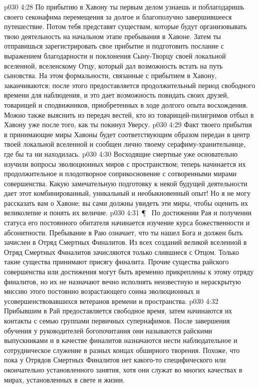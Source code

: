 \vs p030 4:28 По прибытию в Хавону ты первым делом узнаешь и поблагодаришь своего секонафима перемещения за долгое и благополучно завершившееся путешествие. Потом тебя представят существам, которые будут организовывать твою деятельность на начальном этапе пребывания в Хавоне. Затем ты отправишься зарегистрировать свое прибытие и подготовить послание с выражением благодарности и поклонения Сыну\hyp{}Творцу своей локальной вселенной, вселенскому Отцу, который дал возможность встать на путь сыновства. На этом формальности, связанные с прибытием в Хавону, заканчиваются; после этого предоставляется продолжительный период свободного времени для наблюдения, и это дает возможность повидать своих друзей, товарищей и сподвижников, приобретенных в ходе долгого опыта восхождения. Можно также выяснить из передач вестей, кто из товарищей\hyp{}пилигримов отбыл в Хавону уже после того, как ты покинул Уверсу.
\vs p030 4:29 Факт твоего прибытия в принимающие миры Хавоны будет соответствующим образом передан в центр твоей локальной вселенной и сообщен лично твоему серафиму\hyp{}хранительнице, где бы та ни находилась.
\vs p030 4:30 Восходящие смертные уже основательно изучили вопросы эволюционных миров с пространством; теперь начинается их продолжительное и плодотворное соприкосновение с сотворенными мирами совершенства. Какую замечательную подготовку к некой будущей деятельности дает этот комбинированный, уникальный и необыкновенный опыт! Но я не могу рассказать вам о Хавоне; вы сами должны увидеть эти миры, чтобы оценить их великолепие и понять их величие.
\vs p030 4:31 \P\ \bibnobreakspace {} По достижении Рая и получении статуса его постоянного обитателя начинается изучение курса божественности и абсонитности. Пребывание в Раю означает, что ты нашел Бога и должен быть зачислен в Отряд Смертных Финалитов. Из всех созданий великой вселенной в Отряд Смертных Финалитов зачисляются только слившиеся с Отцом. Только такие существа принимают присягу финалита. Прочие существа райского совершенства или достижения могут быть временно прикреплены к этому отряду финалитов, но их не назначают вечно исполнять неизвестную и нераскрытую миссию этого постоянно возрастающего сонма эволюционных и усовершенствовавшихся ветеранов времени и пространства.
\vs p030 4:32 Прибывшим в Рай предоставляется свободное время, затем начинаются их контакты с семью группами первичных супернафимов. После завершения обучения у руководителей богопочитания они называются райскими выпускниками и в качестве финалитов назначаются нести наблюдательное и сотрудническое служение в разных концах обширного творения. Похоже, что пока у Отрядов Смертных Финалитов нет какого\hyp{}то специфического или окончательно установленного занятия, хотя они служат во многих качествах в мирах, установленных в свете и жизни.
